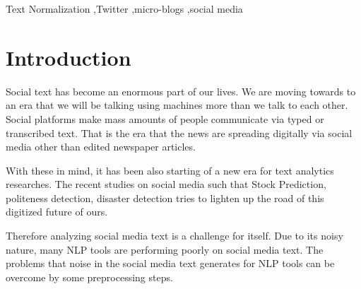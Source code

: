 \documentclass[preprint,review,12pt]{elsarticle}
\begin{document}
\begin{frontmatter}
\begin{abstract}
\end{abstract}

\begin{keyword}
Text Normalization \sep Twitter \sep micro-blogs \sep social media

\end{keyword}

\end{frontmatter}



\section{Introduction}
\label{sec:introduction}

Social text has become an enormous part of our lives. We are moving towards to an era that we will be talking using machines more than we talk to each other. Social platforms make mass amounts of people communicate via typed or transcribed text. That is the era that the news are spreading digitally via social media other than edited newspaper articles.

With these in mind, it has been also starting of a new era for text analytics researches. The recent studies on social media such that Stock Prediction\cite{DBLP:conf/acl/SiMLLLD13}, politeness detection\cite{DBLP:conf/acl/Danescu-Niculescu-MizilSJLP13}, disaster detection\cite{Sakaki:2010:EST:1772690.1772777} tries to lighten up the road of this digitized future of ours.

Therefore analyzing social media text is a challenge for itself. Due to its noisy nature, many NLP tools are performing poorly on social media text\cite{ritter2010unsupervised}. The problems that noise in the social media text generates for NLP tools can be overcome by some preprocessing steps.
\end{document}

